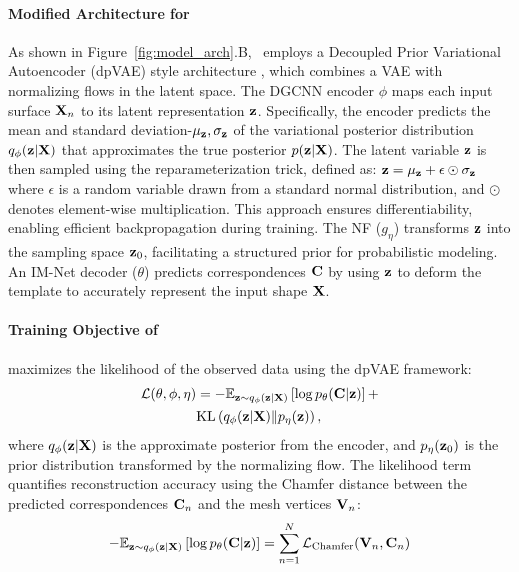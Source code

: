 \begin{enumerate}
\paragraph{Modified Architecture for \model}
As shown in Figure~\ref{fig:model_arch}.B, \model~employs a Decoupled Prior Variational Autoencoder (dpVAE) style architecture \cite{bhalodia2020dpvaes}, which combines a VAE with normalizing flows in the latent space.
The DGCNN encoder \(\phi\) maps each input surface \(\mathbf{X}_n\) to its latent representation \(\mathbf{z}\). Specifically, the encoder predicts the mean and standard deviation-\(\mu_{\mathbf{z}},\sigma_{\mathbf{z}}\) of the variational posterior distribution \(q_{\phi}(\mathbf{z}|\mathbf{X})\) that approximates the true posterior \(p(\mathbf{z}|\mathbf{X})\). The latent variable \(\mathbf{z}\) is then sampled using the reparameterization trick, defined as: \(\mathbf{z} = \mu_{\mathbf{z}} + \epsilon \odot \sigma_{\mathbf{z}}\) where \(\epsilon\) is a random variable drawn from a standard normal distribution, and \(\odot\) denotes element-wise multiplication. This approach ensures differentiability, enabling efficient backpropagation during training. The NF (\(g_\eta\)) transforms \(\mathbf{z}\) into the sampling space \(\mathbf{z}_0\), facilitating a structured prior for probabilistic modeling. An IM-Net decoder (\(\theta\)) predicts correspondences \(\mathbf{C}\) by using \(\mathbf{z}\) to deform the template to accurately represent the input shape \(\mathbf{X}\).
\\

\paragraph{Training Objective of \model} maximizes the likelihood of the observed data using the dpVAE framework:  
\begin{equation}\label{dpvae_objective}
\begin{aligned}
\mathcal{L}(\theta, \phi, \eta) &= - \mathbb{E}_{\mathbf{z} \sim q_{\phi}(\mathbf{z}|\mathbf{X})} \left[ \log p_{\theta}(\mathbf{C}|\mathbf{z}) \right] + \\
& \text{KL}\left(q_{\phi}(\mathbf{z} |\mathbf{X}) \| p_{\eta}(\mathbf{z})\right),
\end{aligned}
\end{equation}
where \(q_{\phi}(\mathbf{z}|\mathbf{X})\) is the approximate posterior from the encoder, and \(p_{\eta}(\mathbf{z}_0)\) is the prior distribution transformed by the normalizing flow. The likelihood term quantifies reconstruction accuracy using the Chamfer distance between the predicted correspondences \(\mathbf{C}_n\) and the mesh vertices \(\mathbf{V}_n\):  
\begin{equation} \label{chamfer_likelihood}
    -\mathbb{E}_{\mathbf{z} \sim q_{\phi}(\mathbf{z}|\mathbf{X})}\left[\log p_{\theta}(\mathbf{C}|\mathbf{z})\right] = \sum_{n=1}^N \mathcal{L}_{\text{Chamfer}}(\mathbf{V}_n, \mathbf{C}_n)
\end{equation}


\end{enumerate}
